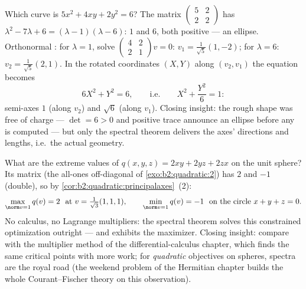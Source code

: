 \begin{example}\label{ex:b2:quadratic:ellipserun}
Which curve is $5x^2 + 4xy + 2y^2 = 6$? The matrix
$\begin{pmatrix} 5 & 2\\ 2 & 2\end{pmatrix}$ has  $\lambda^2 - 7\lambda + 6 = (\lambda - 1)(\lambda -
6)$:  $1$ and $6$, both positive --- an ellipse.
Orthonormal : for $\lambda = 1$, solve
$\begin{pmatrix} 4 & 2\\ 2 & 1\end{pmatrix}v = 0$: $v_1 =
\frac{1}{\sqrt5}(1, -2)$; for $\lambda = 6$: $v_2 =
\frac{1}{\sqrt5}(2, 1)$. In the rotated coordinates $(X, Y)$
along $(v_2, v_1)$ the equation becomes
\[
6X^2 + Y^2 = 6,
\qquad\text{i.e.}\qquad
X^2 + \frac{Y^2}{6} = 1 :
\]
semi-axes $1$ (along $v_2$) and $\sqrt6$ (along $v_1$).
Closing insight: the rough shape was free of charge --- $\det
= 6 > 0$ and positive trace announce an ellipse before any
 is computed --- but only the spectral theorem
delivers the axes' directions and lengths, i.e.\ the actual
geometry.
\end{example}

\begin{example}\label{ex:b2:quadratic:sphereextremes}
What are the extreme values of $q(x,y,z) = 2xy + 2yz + 2zx$ on
the unit sphere? Its matrix (the all-ones off-diagonal of
\cref{exo:b2:quadratic:2}) has  $2$ and $-1$
(double), so by \cref{cor:b2:quadratic:principalaxes}~(2):
\[
\max_{\norm v = 1} q(v) = 2
\ \text{ at } v = \tfrac{1}{\sqrt3}(1,1,1),
\qquad
\min_{\norm v = 1} q(v) = -1
\ \text{ on the circle } x + y + z = 0 .
\]
No calculus, no Lagrange multipliers: the spectral theorem
solves this constrained optimization outright --- and exhibits
the maximizer. Closing insight: compare with the multiplier
method of the differential-calculus chapter, which finds the
same critical points with more work; for \emph{quadratic}
objectives on spheres, spectra are the royal road (the weekend
problem of the Hermitian chapter builds the whole
Courant--Fischer theory on this observation).
\end{example}

